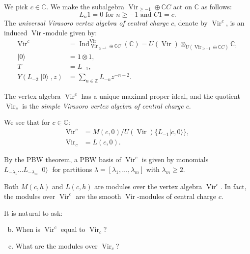 \documentclass{beamer}
\DeclareMathOperator{\Vir}{Vir}
\DeclareMathOperator{\Ind}{Ind}
\DeclareMathOperator{\vac}{|0\rangle}
\begin{document}
\begin{frame}
  \begin{example}
    \label{exa:1}
    We pick $c \in \mathbb{C}$.
    We make the subalgebra $\Vir_{\ge -1} \oplus \mathbb{C}C$ act on $\mathbb{C}$ as follows:
    \begin{equation*}
      \text{$L_n1 = 0$ for $n \ge -1$ and $C1 = c$}.
    \end{equation*}
    The \emph{universal Virasoro vertex algebra of central charge $c$}, denote by $\Vir^c$, is an induced $\Vir$-module given by:
    \begin{align*}
      \Vir^c &= \Ind^{\Vir}_{\Vir_{\ge -1} \oplus \mathbb{C}C}(\mathbb{C}) = U(\Vir) \otimes_{U(\Vir_{\ge -1} \oplus \mathbb{C}C)} \mathbb{C}, \\
      \vac &= 1\otimes1, \\
      T &= L_{-1}, \\
      Y(L_{-2}\vac, z) &= \sum_{n \in \mathbb{Z}}L_{-n}z^{-n - 2}.
    \end{align*}

    The vertex algebra $\Vir^c$ has a unique maximal proper ideal, and the quotient $\Vir_c$ is the \emph{simple Virasoro vertex algebra of central charge $c$}.
  \end{example}
\end{frame}

\begin{frame}
  We see that for $c \in \mathbb{C}$:
  \begin{align*}
    \Vir^c &= M(c, 0)/U(\Vir)\{L_{-1}|c, 0\rangle\}, \\
    \Vir_c &= L(c, 0).
  \end{align*}

  By the PBW theorem, a PBW basis of $\Vir^c$ is given by monomials $L_{-\lambda_1}\dots L_{-\lambda_m}\vac$ for partitions $\lambda = [\lambda_1, \dots, \lambda_m]$ with $\lambda_m \ge 2$.

  \begin{example}[Modules over $\Vir^c$]
    \label{exa:2}
    Both $M(c, h)$ and $L(c, h)$ are modules over the vertex algebra $\Vir^c$.
    In fact, the modules over $\Vir^c$ are the smooth $\Vir$-modules of central charge $c$.
  \end{example}

  It is natural to ask:
  \begin{enumerate}[(a)]
    \setcounter{enumi}{1}
  \item When is $\Vir^c$ equal to $\Vir_c$?
  \item What are the modules over $\Vir_c$?
  \end{enumerate}
\end{frame}
\end{document}
